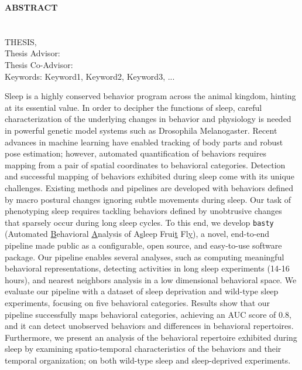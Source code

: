 \clearpage
\begin{center}
    \MakeUppercase{\textbf{Abstract}} \\ [3\baselineskip]
    \MakeUppercase{\thesistitle} \\[3\baselineskip]
    \MakeUppercase{\student} \\[\baselineskip]
    \MakeUppercase{\major \degreeabv Thesis, \month~\year} \\[\baselineskip]
    Thesis Advisor: \advisor \\
    Thesis Co-Advisor: \coadvisor \\
    [2\baselineskip]
    Keywords: Keyword1, Keyword2, Keyword3, ... \\[2\baselineskip]
\end{center}

\onehalfspacing

Sleep is a highly conserved behavior program across the animal kingdom, hinting at its essential value. In order to decipher the functions of sleep, careful characterization of the underlying changes in behavior and physiology is needed in powerful genetic model systems such as Drosophila Melanogaster. Recent advances in machine learning have enabled tracking of body parts and robust pose estimation; however, automated quantification of behaviors requires mapping from a pair of spatial coordinates to behavioral categories. Detection and successful mapping of behaviors exhibited during sleep come with its unique challenges. Existing methods and pipelines are developed with behaviors defined by macro postural changes ignoring subtle movements during sleep. Our task of phenotyping sleep requires tackling behaviors defined by unobtrusive changes that sparsely occur during long sleep cycles. To this end, we develop \texttt{basty} (Automated \underline{B}ehavioral \underline{A}nalysis of A\underline{s}leep Frui\underline{t} Fl\underline{y}), a novel, end-to-end pipeline made public as a configurable, open source, and easy-to-use software package. Our pipeline enables several analyses, such as computing meaningful behavioral representations, detecting activities in long sleep experiments (14-16 hours), and nearest neighbors analysis in a low dimensional behavioral space. We evaluate our pipeline with a dataset of sleep deprivation and wild-type sleep experiments, focusing on five behavioral categories. Results show that our pipeline successfully maps behavioral categories, achieving an AUC score of 0.8, and it can detect unobserved behaviors and differences in behavioral repertoires. Furthermore, we present an analysis of the behavioral repertoire exhibited during sleep by examining spatio-temporal characteristics of the behaviors and their temporal organization; on both wild-type sleep and sleep-deprived experiments.

